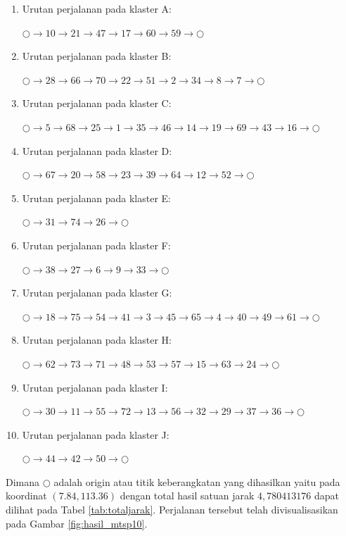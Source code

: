 \begin{enumerate}
\item Urutan perjalanan pada klaster A:

$\bigcirc \to 10 \to 21 \to 47 \to 17 \to 60 \to 59 \to \bigcirc$

\item Urutan perjalanan pada klaster B:

$\bigcirc \to 28 \to 66 \to 70 \to 22 \to 51 \to 2 \to 34 \to 8 \to 7 \to \bigcirc$

\item Urutan perjalanan pada klaster C:

$\bigcirc \to 5 \to 68 \to 25 \to 1 \to 35 \to 46 \to 14 \to 19 \to 69 \to 43 \to 16 \to \bigcirc$

\item Urutan perjalanan pada klaster D:

$\bigcirc \to 67 \to 20 \to 58 \to 23 \to 39 \to 64 \to 12 \to 52 \to \bigcirc$

\item Urutan perjalanan pada klaster E:

$\bigcirc \to 31 \to 74 \to 26 \to \bigcirc$

\item Urutan perjalanan pada klaster F:

$\bigcirc \to 38 \to 27 \to 6 \to 9 \to 33 \to \bigcirc$

\item Urutan perjalanan pada klaster G:

$\bigcirc \to 18 \to 75 \to 54 \to 41 \to 3 \to 45 \to 65 \to 4 \to 40 \to 49 \to 61 \to \bigcirc$

\item Urutan perjalanan pada klaster H:

$\bigcirc \to 62 \to 73 \to 71 \to 48 \to 53 \to 57 \to 15 \to 63 \to 24 \to \bigcirc$

\item Urutan perjalanan pada klaster I:

$\bigcirc \to 30 \to 11 \to 55 \to 72 \to 13 \to 56 \to 32 \to 29 \to 37 \to 36 \to \bigcirc$

\item Urutan perjalanan pada klaster J:

$\bigcirc \to 44 \to 42 \to 50 \to \bigcirc$

\end{enumerate}

Dimana $\bigcirc$ adalah origin atau titik keberangkatan yang dihasilkan yaitu pada koordinat $(7.84, 113.36)$ dengan total hasil satuan jarak $4,780413176$ dapat dilihat pada Tabel \ref{tab:totaljarak}. Perjalanan tersebut telah divisualisasikan pada Gambar \ref{fig:hasil_mtsp10}.

